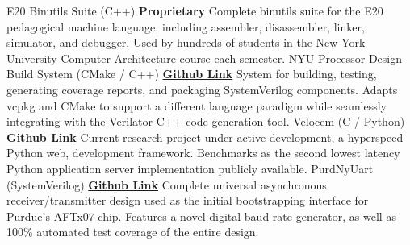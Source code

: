 \documentclass[9pt]{developercv} %
\begin{document}
\begin{fullentrylist}
	\fullentry
	{E20 Binutils Suite (C++)}
	{\textbf{Proprietary}}
	{
		Complete binutils suite for the E20 pedagogical machine language, including
		assembler, disassembler, linker, simulator, and debugger. Used by hundreds of
		students in the New York University Computer Architecture course each
		semester.
	}
	\fullentry
	{NYU Processor Design Build System (CMake / C++)}
	{
		{\href{https://github.com/NYU-Processor-Design/component-template}{\textbf{Github Link}}}
	}
	{
		System for building, testing, generating coverage reports, and packaging
		SystemVerilog components. Adapts vcpkg and CMake to support a different
		language paradigm while seamlessly integrating with the Verilator C++ code
		generation tool.
	}
	\fullentry
	{Velocem (C / Python)}
	{
		{\href{https://github.com/nickelpro/velocem}{\textbf{Github Link}}}
	}
	{
		Current research project under active development, a hyperspeed Python web,
		development framework. Benchmarks as the second lowest latency Python
		application server implementation publicly available.
	}
	\fullentry
	{PurdNyUart (SystemVerilog)}
	{
		{\href{https://github.com/NYU-Processor-Design/PurdNyUart}{\textbf{Github Link}}}
	}
	{
		Complete universal asynchronous receiver/transmitter design used as the
		initial bootstrapping interface for Purdue's AFTx07 chip. Features a novel
		digital baud rate generator, as well as 100\% automated test coverage of
		the entire design.
	}
\end{fullentrylist}
\end{document}
